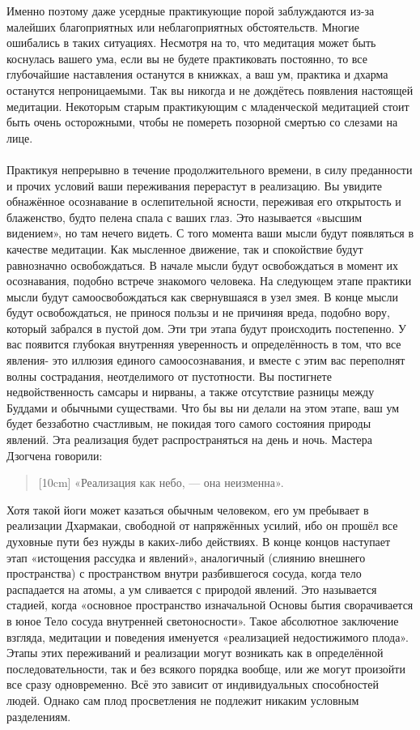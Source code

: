 Именно поэтому даже усердные практикующие порой заблуждаются из-за малейших благоприятных или неблагоприятных обстоятельств. Многие ошибались в таких ситуациях. Несмот\-ря на то, что медитация может быть коснулась вашего ума, если вы не будете практиковать постоянно, то все глубочайшие наставления останутся в книжках, а ваш ум, практика и дхарма останутся непроницаемыми. Так вы никогда и не дождётесь появления настоящей медитации. Некоторым старым практикующим с младенческой медитацией стоит быть очень осторожными, чтобы не помереть позорной смертью со слеза\-ми на лице.
\\ \\ Практикуя непрерывно в течение продолжительного времени, в силу преданности и прочих условий ваши переживания перерастут в реализацию. Вы увидите обнажённое осознавание в ослепительной ясности, переживая его открытость и блаженство, будто пелена спала с ваших глаз. Это называется «высшим видением», но там нечего видеть. С того момента ваши мысли будут появляться в качестве медитации. Как мысленное движение, так и спокойствие будут равнозначно освобождаться. В начале мысли будут освобождаться в момент их осознавания, подобно встрече знакомого человека. На следующем этапе практики мысли будут самоосвобождать\-ся как свернувшаяся в узел змея. В конце мысли будут освобождаться, не принося пользы и не причиняя вреда, подобно вору, который забрался в пустой дом. Эти три этапа будут происходить постепенно. У вас появится глубокая внутренняя уверенность и определённость в том, что все явления- это иллюзия единого самоосознавания, и вместе с этим вас переполнят волны сострадания, неотделимого от пустотности. Вы постигнете недвойственность самсары и нирваны, а также отсутствие разницы между Буддами и обычными существами. Что бы вы ни делали на этом этапе, ваш ум будет беззаботно счастливым, не покидая того самого состояния природы явлений. Эта реализация будет распространяться на день и ночь. Мастера Дзогчена говорили:
\begin{verse}[10cm]
«Реализация как небо, — она неизменна».
\end{verse}
Хотя такой йоги может казаться обычным человеком, его ум пребывает в реализации Дхармакаи, свободной от напряжён\-ных усилий, ибо он прошёл все духовные пути без нужды в каких-либо действиях. В конце концов наступает этап «истощения рассудка и явлений», аналогичный (слиянию внешнего пространства) с пространством внутри разбившегося сосуда, когда тело распадается на атомы, а ум сливается с природой явлений. Это называется стадией, когда «основное пространство изначальной Основы бытия сворачивается в юное Тело сосуда внутренней светоносности». Такое абсолютное заключение взгляда, медитации и поведения именуется «реализацией недостижимого плода». Этапы этих переживаний и реализации могут возникать как в определённой последовательности, так и без всякого порядка вообще, или же могут произойти все сразу одновременно. Всё это зависит от индивидуальных способностей людей. Однако сам плод просветления не подлежит никаким условным разделениям.

